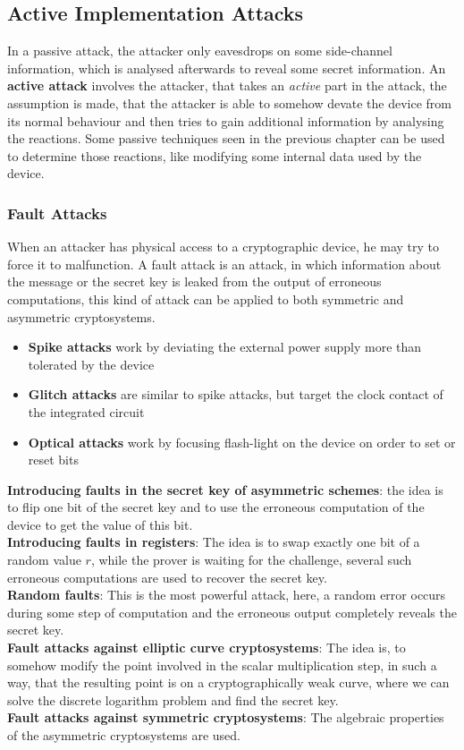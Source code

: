 \documentclass[a4paper, 10 pt, conference]{ieeeconf}
\begin{document}
\subsection{\textbf{Active Implementation Attacks}}
In a passive attack, the attacker only eavesdrops on some side-channel information, which is analysed afterwards to reveal some secret information. An \textbf{active attack} involves the attacker, that takes an \emph{active} part in the attack, the assumption is made, that the attacker is able to somehow devate the device from its normal behaviour and then tries to gain additional information by analysing the reactions. Some passive techniques seen in the previous chapter can be used to determine those reactions, like modifying some internal data used by the device. 
\vspace{0.5cm}
\subsubsection{\textbf{Fault Attacks}}
\label{faultatt}
When an attacker has physical access to a cryptographic device, he may try to force it to malfunction. 
A fault attack is an attack, in which information about the message or the secret key is leaked from the output of erroneous computations, this kind of attack can be applied to both symmetric and asymmetric cryptosystems. 
\begin{itemize}
\item \textbf{Spike attacks} work by deviating the external power supply more than tolerated by the device
\item \textbf{Glitch attacks} are similar to spike attacks, but target the clock contact of the integrated circuit
\item \textbf{Optical attacks} work by focusing flash-light on the device on order to set or reset bits
\end{itemize}
\textbf{Introducing faults in the secret key of asymmetric schemes}: the idea is to flip one bit of the secret key and to use the erroneous computation of the device to get the value of this bit. \\
\textbf{Introducing faults in registers}: The idea is to swap exactly one bit of a random value $r$, while the prover is waiting for the challenge, several such erroneous computations are used to recover the secret key. \\
\textbf{Random faults}: This is the most powerful attack, here, a random error occurs during some step of computation and the erroneous output completely reveals the secret key. \\
\textbf{Fault attacks against elliptic curve cryptosystems}: The idea is, to somehow modify the point involved in the scalar multiplication step, in such a way, that the resulting point is on a cryptographically weak curve, where we can solve the discrete logarithm problem and find the secret key. \\
\textbf{Fault attacks against symmetric cryptosystems}: The algebraic properties of the asymmetric cryptosystems are used. 
\end{document}
